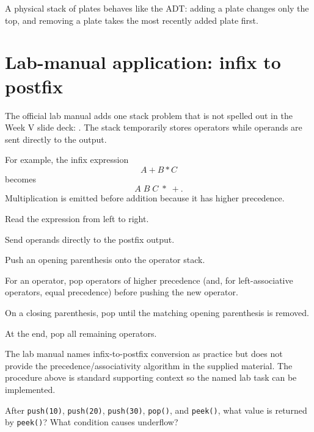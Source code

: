 \begin{intuition}
A physical stack of plates behaves like the ADT: adding a plate changes only the top, and removing a plate takes the most recently added plate first.
\end{intuition}

\section{Lab-manual application: infix to postfix}

The official lab manual adds one stack problem that is not spelled out in the Week V slide deck: . The stack temporarily stores operators while operands are sent directly to the output.

For example, the infix expression
\[
A + B * C
\]
becomes
\[
A\;B\;C\;*\;+.
\]
Multiplication is emitted before addition because it has higher precedence.

\begin{mlsteps}
  \item Read the expression from left to right.
  \item Send operands directly to the postfix output.
  \item Push an opening parenthesis onto the operator stack.
  \item For an operator, pop operators of higher precedence (and, for left-associative operators, equal precedence) before pushing the new operator.
  \item On a closing parenthesis, pop until the matching opening parenthesis is removed.
  \item At the end, pop all remaining operators.
\end{mlsteps}

\begin{clarification}
The lab manual names infix-to-postfix conversion as practice but does not provide the precedence/associativity algorithm in the supplied material. The procedure above is standard supporting context so the named lab task can be implemented.
\end{clarification}

\begin{quickcheck}
After \texttt{push(10)}, \texttt{push(20)}, \texttt{push(30)}, \texttt{pop()}, and \texttt{peek()}, what value is returned by \texttt{peek()}? What condition causes underflow?
\end{quickcheck}

